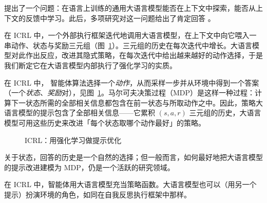 \citet{krishnamurthy2024can} 提出了一个问题：在语言上训练的通用大语言模型能否在上下文中探索，能否从上下文的反馈中学习。此后，多项研究对这一问题给出了肯定回答 \citep{demircan2024sparse,song2025reward,moeini2025survey,monea2024llms,nie2024evolve,wang2024transformers}。%

在 ICRL 中，一个外部执行框架迭代地调用大语言模型，在上下文中向它喂入一串动作、状态与奖励三元组（图~\ref{fig:rl-icrl}）。三元组的历史在每次迭代中增长。大语言模型对此作出反应，改进其隐式策略，在每次迭代中给出越来越好的动作选择，于是我们断定它在大语言模型内部执行了强化学习的实质。

在 ICRL 中，%
智能体算法选择一个{\em 动作}，从而采样一步并从环境中得到一个答案（一个{\em 状态}、{\em 奖励}对），见图~\ref{fig:rl-icrl}。马尔可夫决策过程（MDP）是这样一种过程：计算下一状态所需的全部相关信息都包含在前一状态与所取动作之中。因此，策略大语言模型的提示包含了全部相关信息——它累积 $(s,a,r)$ 三元组的历史，大语言模型可用这些历史来改进「每个状态取哪个动作最好」的策略。
\begin{figure}[t]
  \begin{center}
    
    \caption{ICRL：用强化学习做提示优化}\label{fig:rl-icrl}
  \end{center}
\end{figure}
关于状态，回答的历史是一个自然的选择；但一般而言，如何最好地把大语言模型的提示改进建模为 MDP，仍是一个活跃的研究领域。

在 ICRL 中，智能体用大语言模型充当策略函数。大语言模型也可以（用另一个提示）扮演环境的角色，如同在自我反思执行框架中那样。

